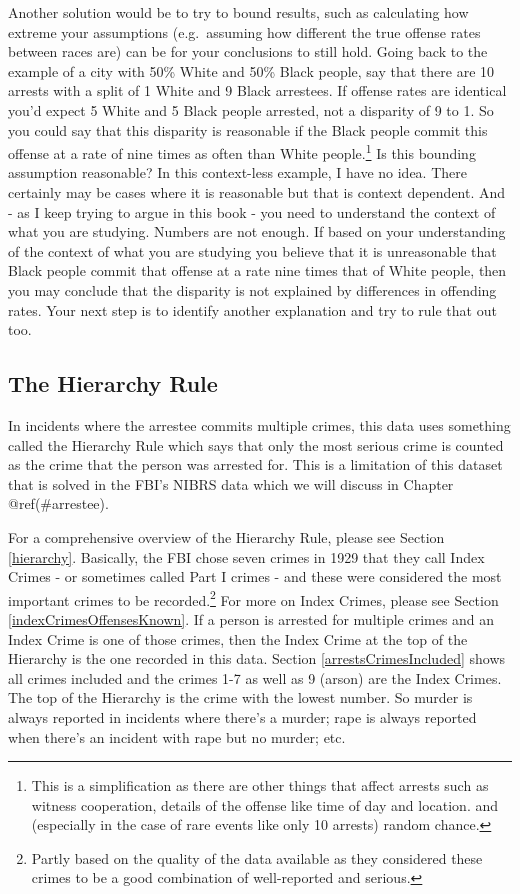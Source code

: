 \documentclass[
  12pt,
  openany]{book}
\begin{document}
Another solution would be to try to bound results, such as calculating how extreme your assumptions (e.g.~assuming how different the true offense rates between races are) can be for your conclusions to still hold. Going back to the example of a city with 50\% White and 50\% Black people, say that there are 10 arrests with a split of 1 White and 9 Black arrestees. If offense rates are identical you'd expect 5 White and 5 Black people arrested, not a disparity of 9 to 1. So you could say that this disparity is reasonable if the Black people commit this offense at a rate of nine times as often than White people.\footnote{This is a simplification as there are other things that affect arrests such as witness cooperation, details of the offense like time of day and location. and (especially in the case of rare events like only 10 arrests) random chance.} Is this bounding assumption reasonable? In this context-less example, I have no idea. There certainly may be cases where it is reasonable but that is context dependent. And - as I keep trying to argue in this book - you need to understand the context of what you are studying. Numbers are not enough. If based on your understanding of the context of what you are studying you believe that it is unreasonable that Black people commit that offense at a rate nine times that of White people, then you may conclude that the disparity is not explained by differences in offending rates. Your next step is to identify another explanation and try to rule that out too.

\subsection{The Hierarchy Rule}\label{the-hierarchy-rule}

In incidents where the arrestee commits multiple crimes, this data uses something called the Hierarchy Rule which says that only the most serious crime is counted as the crime that the person was arrested for. This is a limitation of this dataset that is solved in the FBI's NIBRS data which we will discuss in Chapter @ref(\#arrestee).

For a comprehensive overview of the Hierarchy Rule, please see Section \ref{hierarchy}. Basically, the FBI chose seven crimes in 1929 that they call Index Crimes - or sometimes called Part I crimes - and these were considered the most important crimes to be recorded.\footnote{Partly based on the quality of the data available as they considered these crimes to be a good combination of well-reported and serious.} For more on Index Crimes, please see Section \ref{indexCrimesOffensesKnown}. If a person is arrested for multiple crimes and an Index Crime is one of those crimes, then the Index Crime at the top of the Hierarchy is the one recorded in this data. Section \ref{arrestsCrimesIncluded} shows all crimes included and the crimes 1-7 as well as 9 (arson) are the Index Crimes. The top of the Hierarchy is the crime with the lowest number. So murder is always reported in incidents where there's a murder; rape is always reported when there's an incident with rape but no murder; etc.
\end{document}
